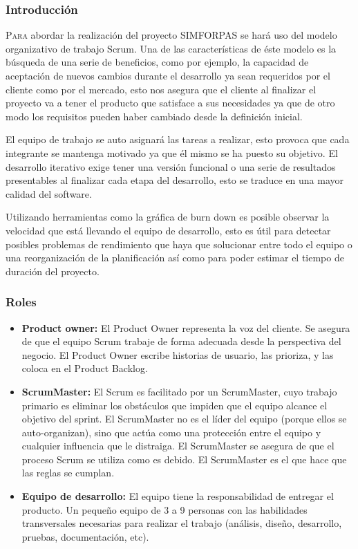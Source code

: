 \documentclass[12pt,a4paper,spanish]{book} %
\begin{document}
\subsubsection{Introducción}

\lettrine{P}{ara} abordar la realización del proyecto SIMFORPAS se hará uso del modelo organizativo de trabajo Scrum. Una de las características de éste modelo es la búsqueda de una serie de beneficios, como por ejemplo, la capacidad de aceptación de nuevos cambios durante el desarrollo ya sean requeridos por el cliente como por el mercado, esto nos asegura que el cliente al finalizar el proyecto va a tener el producto que satisface a sus necesidades ya que de otro modo los requisitos pueden haber cambiado desde la definición inicial.

El equipo de trabajo se auto asignará las tareas a realizar, esto provoca que cada integrante se mantenga motivado ya que él mismo se ha puesto su objetivo. El desarrollo iterativo exige tener una versión funcional o una serie de resultados presentables al finalizar cada etapa del desarrollo, esto se traduce en una mayor calidad del software.

Utilizando herramientas como la gráfica de burn down es posible observar la velocidad que está llevando el equipo de desarrollo, esto es útil para detectar posibles problemas de rendimiento que haya que solucionar entre todo el equipo o una reorganización de la planificación así como para poder estimar el tiempo de duración del proyecto.

\subsubsection{Roles}

\begin{itemize}
\item \textbf{Product owner:} El Product Owner representa la voz del cliente. Se asegura de que el equipo Scrum trabaje de forma adecuada desde la perspectiva del negocio. El Product Owner escribe historias de usuario, las prioriza, y las coloca en el Product Backlog.
\item \textbf{ScrumMaster:} El Scrum es facilitado por un ScrumMaster, cuyo trabajo primario es eliminar los obstáculos que impiden que el equipo alcance el objetivo del sprint. El ScrumMaster no es el líder del equipo (porque ellos se auto-organizan), sino que actúa como una protección entre el equipo y cualquier influencia que le distraiga. El ScrumMaster se asegura de que el proceso Scrum se utiliza como es debido. El ScrumMaster es el que hace que las reglas se cumplan.
\item \textbf{Equipo de desarrollo:} El equipo tiene la responsabilidad de entregar el producto. Un pequeño equipo de 3 a 9 personas con las habilidades transversales necesarias para realizar el trabajo (análisis, diseño, desarrollo, pruebas, documentación, etc).
\end{itemize}
\end{document}
